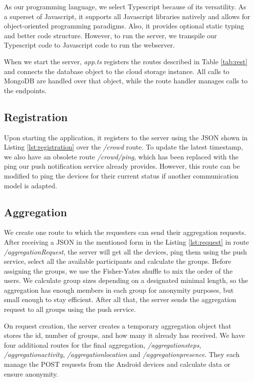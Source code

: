 As our programming language, we select Typescript because of its versatility. As a superset of Javascript, it supports all Javascript libraries natively and allows for object-oriented programming paradigms. Also, it provides optional static typing and better code structure. However, to run the server, we transpile our Typescript code to Javascript code to run the webserver.

When we start the server, \textit{app.ts} registers the routes described in Table \ref{tab:rest} and connects the database object to the cloud storage instance. All calls to MongoDB are handled over that object, while the route handler manages calls to the endpoints.

\subsection{Registration}
Upon starting the application, it registers to the server using the JSON shown in Listing \ref{lst:registration} over the \textit{/crowd} route. To update the latest timestamp, we also have an obsolete route \textit{/crowd/ping}, which has been replaced with the ping our push notification service already provides. However, this route can be modified to ping the devices for their current status if another communication model is adapted.

\subsection{Aggregation}
We create one route to which the requesters can send their aggregation requests. After receiving a JSON in the mentioned form in the Listing \ref{lst:request} in route \textit{/aggregationRequest}, the server will get all the devices, ping them using the push service, select all the available participants and calculate the groups. Before assigning the groups, we use the Fisher-Yates shuffle to mix the order of the users. We calculate group sizes depending on a designated minimal length, so the aggregation has enough members in each group for anonymity purposes, but small enough to stay efficient. After all that, the server sends the aggregation request to all groups using the push service.

On request creation, the server creates a temporary aggregation object that stores the id, number of groups, and how many it already has received. We have four additional routes for the final aggregation, \textit{/aggregationsteps}, \textit{/aggregationactivity}, \textit{/aggregationlocation} and \textit{/aggregationpresence}. They each manage the POST requests from the Android devices and calculate data or ensure anonymity.

